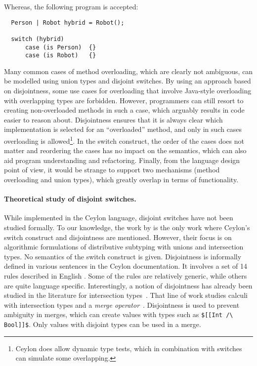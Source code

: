 \noindent Whereas, the following program is accepted:

\begin{lstlisting}
  Person | Robot hybrid = Robot();

  switch (hybrid)
      case (is Person)  {}
      case (is Robot)   {}
\end{lstlisting}

Many common cases of method overloading, which are clearly
not ambiguous, can be modelled using union types and disjoint switches.
By using an approach based on disjointness, some use cases for
overloading that involve Java-style overloading with
overlapping types are forbidden. However,
programmers can still resort to creating non-overloaded methods in
such a case, which arguably results in code easier to reason about.
Disjointness ensures that it is always
clear which implementation is selected for an ``overloaded'' method,
and only in such cases overloading is allowed\footnote{Ceylon
  does allow dynamic type tests, which
  in combination with switches can simulate some overlapping.}.
In the switch construct,
the order of the cases does not matter and reordering the cases has no
impact on the semantics, which can also aid program understanding and
refactoring.
Finally, from the language design point of view, it would be strange to support two
mechanisms (method overloading and union types), which greatly overlap
in terms of functionality.

\paragraph{Theoretical study of disjoint switches.}
While implemented in the Ceylon language,
disjoint switches have not been studied formally.
To our knowledge, the work by \citet{muehlboeck2018empowering} is the only work
where Ceylon's switch construct
and disjointness are mentioned. However, their focus
is on algorithmic formulations of distributive subtyping
with unions and intersection types. No semantics of the switch construct is given.
Disjointness is informally defined in various sentences in the
Ceylon documentation. It involves a set of 14 rules described in
English \citep{ceylondisjointness}.
Some of the rules are relatively generic, while
others are quite language specific.
Interestingly, a notion
of disjointness has already been studied in the literature
for intersection types~\citep{oliveira2016disjoint}. That line of work studies calculi
with intersection types and a \textit{merge operator}~\citep{reynolds1988preliminary}. Disjointness
is used to prevent ambiguity in merges, which can create
values with types such as \lstinline{$[[Int /\ Bool]]$}. Only values
with disjoint types can be used in a merge.

